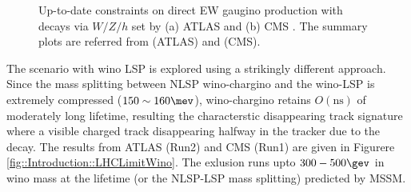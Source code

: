 \begin{figure}[h]
  \centering
    \caption{Up-to-date constraints on direct EW gaugino production with decays via $W/Z/h$ set by (a) ATLAS \cite{ATLAS_SUSY_EW2L3L} and (b) CMS \cite{CMS_SUSY_EWK2L3L}.
      The summary plots are referred from \cite{ATLAS_SUSY_PublicResult} (ATLAS) and \cite{CMS_SUSY_PubResult} (CMS).
    }
    \label{fig::Introduction::LHCLimitEWKino}
\end{figure}


The scenario with wino LSP is explored using a strikingly different approach. Since the mass splitting between NLSP wino-chargino and the wino-LSP is extremely compressed ($150 \sim 160\mev$), wino-chargino retains $O(\mathrm{ns})$ of moderately long lifetime, resulting the characterstic disappearing track signature where a visible charged track disappearing halfway in the tracker due to the decay. The results from ATLAS (Run2) and CMS (Run1) are given in Figurere \ref{fig::Introduction::LHCLimitWino}.
The exlusion runs upto $300-500\gev$ in wino mass at the lifetime (or the NLSP-LSP mass splitting) predicted by MSSM. \\

